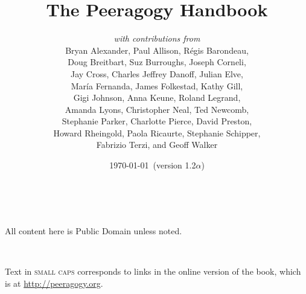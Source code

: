 \documentclass[ebook, 12pt, twoside]{memoir}
\let\sc\scshape
\let\sc\scshape
\begin{document}
\sloppy 
{}
\title{The Peeragogy Handbook\\[1in]}
\author{
\emph{with contributions from} \\
{\small Bryan Alexander, Paul Allison, R\'egis Barondeau,} \\
{\small Doug Breitbart, Suz Burroughs,  Joseph Corneli, }\\ 
{\small Jay Cross, Charles Jeffrey Danoff, Julian Elve,}\\
{\small Mar\'ia Fernanda, James Folkestad, Kathy Gill, }\\
{\small Gigi Johnson, Anna Keune, Roland Legrand,} \\
{\small Amanda Lyons, Christopher Neal, Ted Newcomb,} \\
{\small Stephanie Parker, Charlotte Pierce, David Preston,} \\
{\small Howard Rheingold, Paola Ricaurte, Stephanie Schipper,} \\
{\small Fabrizio Terzi, and Geoff Walker}
}
\date{\today\ (version 1.2$\alpha$)}
\maketitle
\thispagestyle{empty}

\quad \\[3in] 
\begin{center}
{\large All content here is Public Domain unless noted.}
\end{center}
\quad \\
\begin{center}
{\large Text in {\sc small caps} corresponds to links in the online
  version of the book, which is at \url{http://peeragogy.org}.}
\end{center}
\thispagestyle{empty}
\end{document}
